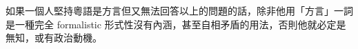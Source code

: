 \documentclass[a5paper, 10pt, openany]{book} %
\makeatletter
\renewcommand\chapter{\if@openright\cleardoublepage\else\clearpage\fi
  \thispagestyle{plain}%
  \global\@topnum\z@
  \@afterindentfalse
  \secdef\@chapter\@schapter}
\makeatother
\begin{document}
如果一個人堅持粵語是方言但又無法回答以上的問題的話，除非他用「方言」一詞是一種完全 formalistic 形式性沒有內涵，甚至自相矛盾的用法，否則他就必定是無知，或有政治動機。
































\end{document}
